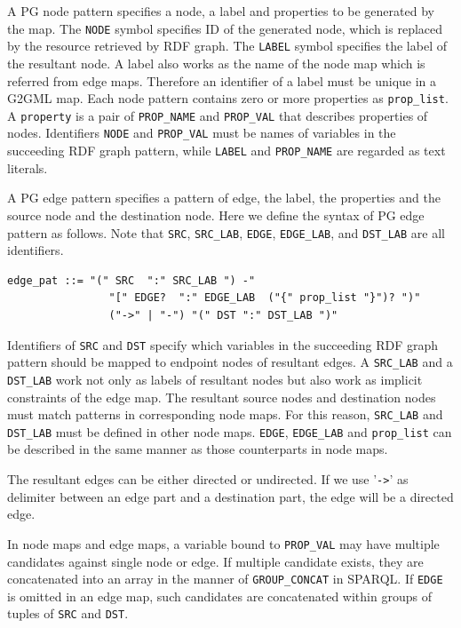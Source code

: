 \documentclass[runningheads]{llncs}
\begin{document}
A PG node pattern specifies a node, a label and properties to be generated by the map. The \texttt{NODE} symbol specifies ID of the generated node, which is replaced by the resource retrieved by RDF graph. The \texttt{LABEL} symbol specifies the label of the resultant node. A label also works as the name of the node map which is referred from edge maps.
Therefore an identifier of a label must be unique in a  G2GML map.
Each node pattern contains zero or more properties as \texttt{prop\_list}.
A \texttt{property} is a pair of \texttt{PROP\_NAME} and \texttt{PROP\_VAL} that describes properties of nodes.
Identifiers \texttt{NODE} and \texttt{PROP\_VAL} must be names of variables in the succeeding RDF graph pattern, while \texttt{LABEL} and \texttt{PROP\_NAME} are regarded as text literals.
 
A PG edge pattern specifies a pattern of edge, the label, the properties and the source node and the destination node.
Here we define the syntax of PG edge pattern as follows.
Note that \texttt{SRC}, \texttt{SRC\_LAB}, \texttt{EDGE}, \texttt{EDGE\_LAB},  and \texttt{DST\_LAB} are all identifiers.
\begin{defi}
\leavevmode
\begin{verbatim}
edge_pat ::= "(" SRC  ":" SRC_LAB ") -" 
                "[" EDGE?  ":" EDGE_LAB  ("{" prop_list "}")? ")" 
                ("->" | "-") "(" DST ":" DST_LAB ")"
\end{verbatim}
\end{defi}

 Identifiers of \texttt{SRC} and \texttt{DST} specify which variables in the succeeding RDF graph pattern should be mapped to endpoint nodes of resultant edges.
A \texttt{SRC\_LAB} and a \texttt{DST\_LAB} work not only as labels of resultant nodes but also work as implicit constraints of the edge map.
The resultant source nodes and destination nodes must match patterns in corresponding node maps.
For this reason, \texttt{SRC\_LAB} and \texttt{DST\_LAB} must be defined in other node maps.
\texttt{EDGE}, \texttt{EDGE\_LAB} and \texttt{prop\_list} can be described in the same manner as those counterparts in node maps.

The resultant edges can be either directed or undirected. If we use '\texttt{->}' as delimiter between an edge part and a destination part, the edge will be a directed edge.

In node maps and edge maps, a variable bound to \texttt{PROP\_VAL} may have multiple candidates against single node or edge. If multiple candidate exists, they are concatenated into an array in the manner of \texttt{GROUP\_CONCAT} in SPARQL. If \texttt{EDGE} is omitted in an edge map, such candidates are concatenated  within groups of tuples of \texttt{SRC} and \texttt{DST}.
\end{document}
